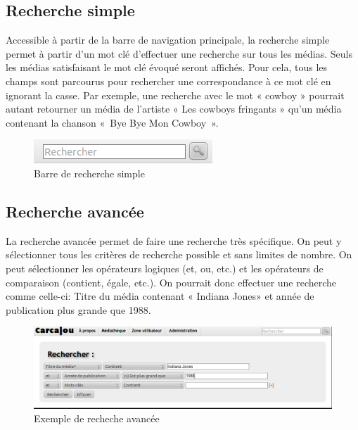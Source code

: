 \documentclass[letter, 11pt]{report}
\begin{document}
\subsection{Recherche simple}
Accessible à partir de la barre de navigation principale, la recherche simple permet à partir d'un mot clé d'effectuer une recherche sur tous les médias. Seuls les médias satisfaisant le mot clé évoqué seront affichés. Pour cela, tous les champs sont parcourus pour rechercher une correspondance à ce mot clé en ignorant la casse. Par exemple, une recherche avec le mot « cowboy » pourrait autant retourner un média de l'artiste « Les cowboys fringants » qu'un média contenant la chanson «~Bye Bye Mon Cowboy~».

\begin{figure}[htbp]
	\begin{center}
		\includegraphics[scale=0.5]{captures_ecran/barre_recherche_simple.png}
	\end{center}
	\caption{Barre de recherche simple}
\end{figure}

\subsection{Recherche avancée}
\label{sec:recherche-avancée}
La recherche avancée permet de faire une recherche très spécifique. On peut y sélectionner tous les critères de recherche possible et sans limites de nombre. On peut sélectionner les opérateurs logiques (et, ou, etc.) et les opérateurs de comparaison (contient, égale, etc.). On pourrait donc effectuer une recherche comme celle-ci: Titre du média contenant « Indiana Jones» et année de publication plus grande que 1988.

\begin{figure}[htbp]
	\begin{center}
		\includegraphics[scale=0.5]{captures_ecran/exemple_recherche_avancee.png}
	\end{center}
	\caption{Exemple de recheche avancée}
\end{figure}
\end{document}
